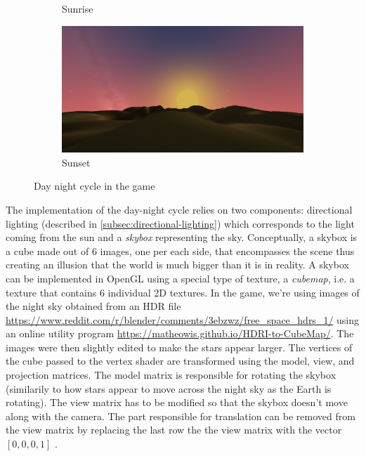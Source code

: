 \begin{figure}[h]
\begin{subfigure}[b]{0.475\textwidth}
        \caption[]%
        {{\small Sunrise}}
        \label{fig:cycle-sunrise}
    \end{subfigure}
    \hfill
    \begin{subfigure}[b]{0.475\textwidth}
        \centering
        \includegraphics[width=\textwidth]{chapters/lighting/sections/environment/resources/sunset.png}
        \caption[]%
        {{\small Sunset}}
        \label{fig:cycle-sunset}
    \end{subfigure}
    \caption[]
    {\small Day night cycle in the game}
    \label{fig:cycle}
\end{figure}

The implementation of the day-night cycle relies on two components: directional lighting (described in \autoref{subsec:directional-lighting}) which corresponds to the light coming from the sun and a \textit{skybox} representing the sky.
Conceptually, a skybox is a cube made out of 6 images, one per each side, that encompasses the scene thus creating an illusion that the world is much bigger than it is in reality.
A skybox can be implemented in OpenGL using a special type of texture, a \textit{cubemap}, i.e. a texture that contains 6 individual 2D textures.
In the game, we're using images of the night sky obtained from an HDR file \url{https://www.reddit.com/r/blender/comments/3ebzwz/free_space_hdrs_1/} using an online utility program \url{https://matheowis.github.io/HDRI-to-CubeMap/}.
The images were then slightly edited to make the stars appear larger. 
The vertices of the cube passed to the vertex shader are transformed using the model, view, and projection matrices.
The model matrix is responsible for rotating the skybox (similarily to how stars appear to move across the night sky as the Earth is rotating).
The view matrix has to be modified so that the skybox doesn't move along with the camera.
The part responsible for translation can be removed from the view matrix by replacing the last row the the view matrix with the vector $[0, 0, 0, 1]$ \cite{LearnOpenGL-Cubemaps}.


